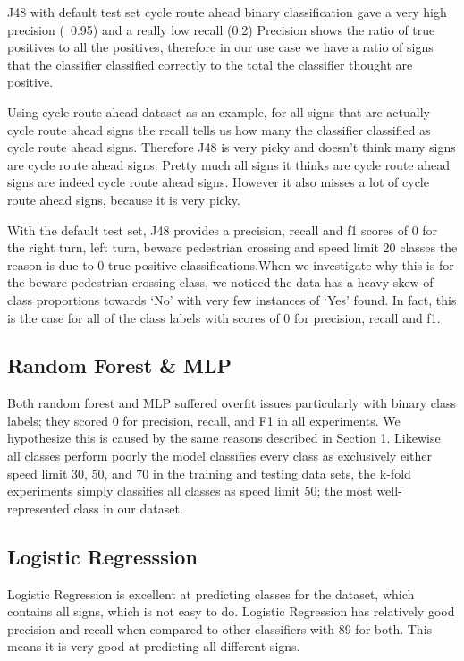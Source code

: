 \documentclass[11pt]{article}
\begin{document}
J48 with default test set cycle route ahead binary classification gave a very high precision (~0.95) and a really low recall (0.2) 
Precision shows the ratio of true positives to all the positives, therefore in our use case we have a ratio of signs that the classifier classified correctly to the total the classifier thought are positive. 
\par
Using cycle route ahead dataset as an example, for all signs that are actually cycle route ahead signs the recall tells us how many the classifier classified as cycle route ahead  signs. 
Therefore J48 is very picky and doesn't think many signs are cycle route ahead signs. Pretty much all signs it thinks are cycle route ahead signs are indeed cycle route ahead signs. However it also misses a lot of cycle route ahead signs, because it is very picky.
\par
With the default test set, J48 provides a precision, recall and f1 scores of 0 for the right turn, left turn, beware pedestrian crossing and speed limit 20 classes the reason is due to 0 true positive classifications.When we investigate why this is for the beware pedestrian crossing class, we noticed the data has a heavy skew of class proportions towards ‘No’ with very few instances of ‘Yes’ found. In fact, this is the case for all of the class labels with scores of 0 for precision, recall and f1.

\subsection{Random Forest \& MLP}
Both random forest and MLP suffered overfit issues particularly with binary class labels; they scored 0 for precision, recall, and F1 in all experiments. We hypothesize this is caused by the same reasons described in Section 1. Likewise all classes perform poorly the model classifies every class as exclusively either speed limit 30, 50, and 70 in the training and testing data sets, the k-fold experiments simply classifies all classes as speed limit 50; the most well-represented class in our dataset. 

\subsection{Logistic Regresssion}
Logistic Regression is excellent at predicting classes for the dataset, which contains all signs, which is not easy to do. Logistic Regression has relatively good precision and recall when compared to other classifiers with 89 for both. This means it is very good at predicting all different signs.
\end{document}
